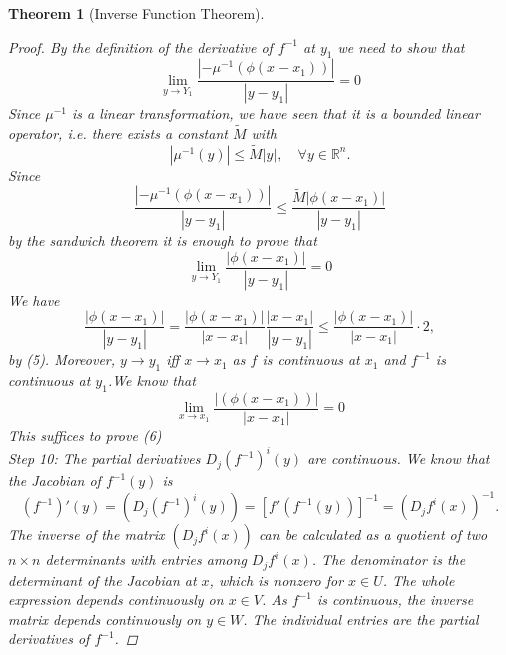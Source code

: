 \documentclass[11pt]{article}
\def\RR{\mathbb{R}}
\newtheorem{theorem}{Theorem}[section]
\begin{document}
\begin{theorem}[Inverse Function Theorem]
\begin{proof}
By the definition of the derivative of $f^{-1}$ at $y_1$ we need to show that
\begin{equation}
\lim_{y \rightarrow Y_1}\frac{|-\mu^{-1}(\phi(x-x_1))|}{|y-y_1|}=0
\end{equation}
Since $\mu^{-1}$ is a linear transformation, we have seen that it is a bounded linear operator, i.e.
there exists a constant $\tilde{M}$ with
\[|\mu^{-1}(y)| \leq \tilde{M}|y|, \quad \forall y \in \RR^n . \]
Since
\[ \frac{|-\mu^{-1}(\phi(x-x_1))|}{|y-y_1|} \leq \frac{\tilde{M}|\phi(x-x_1)|}{|y-y_1|} \]
by the sandwich theorem it is enough to prove that
\[\lim_{y \rightarrow Y_1}\frac{|\phi(x-x_1)|}{|y-y_1|} =0\]
We have 
\[\frac{|\phi(x-x_1)|}{|y-y_1|} = \frac{|\phi(x-x_1)|}{|x-x_1|}\frac{|x-x_1|}{|y-y_1|} \leq \frac{|\phi(x-x_1)|}{|x-x_1|}\cdot 2,\]
by (5). Moreover, $y \rightarrow y_1$ iff $ x \rightarrow x_1$ as $ f$ is continuous at $x_1$ and $f^{-1}$ is continuous at $y_1$.We know that
\[\lim_{x \rightarrow x_1} \frac{|(\phi(x-x_1))|}{|x-x_1|} = 0 \]
This suffices to prove (6)\\
\textit{Step 10:} The partial derivatives $D_j (f^{-1})^i(y)$ are continuous. We know that the Jacobian of $f^{-1}(y)$ is
\[(f^{-1})'(y) = (D_j (f^{-1})^i(y)) = [f'(f^{-1}(y))]^{-1} = (D_j f^i (x))^{-1}. \] 
The inverse of the matrix $(D_jf^i(x))$ can be calculated as a quotient of two $n \times n$ determinants with entries among $D_jf^i(x)$. The denominator is the determinant of the Jacobian at $x$, which is nonzero for $x \in U$. The whole expression depends continuously on $x \in V$. As $f^{-1}$ is continuous, the inverse matrix depends continuously on $y \in W$. The individual entries are the partial derivatives of $f^{-1}$.
\end{proof}
\end{theorem}
\end{document}
